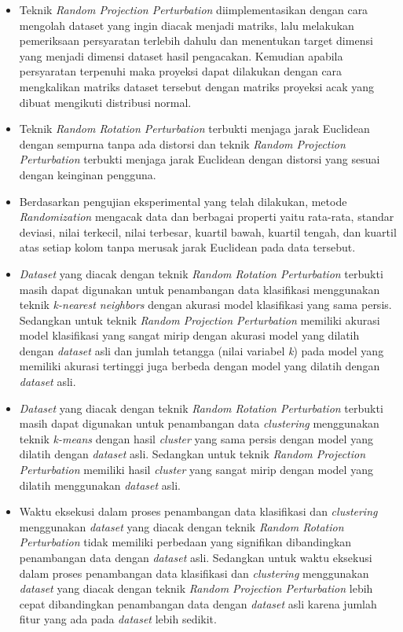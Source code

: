 \begin{itemize}
    \item Teknik \textit{Random Projection Perturbation} diimplementasikan dengan cara mengolah dataset yang ingin diacak menjadi matriks, lalu melakukan pemeriksaan persyaratan terlebih dahulu dan menentukan target dimensi yang menjadi dimensi dataset hasil pengacakan. Kemudian apabila persyaratan terpenuhi maka proyeksi dapat dilakukan dengan cara mengkalikan matriks dataset tersebut dengan matriks proyeksi acak yang dibuat mengikuti distribusi normal.
    \item Teknik \textit{Random Rotation Perturbation} terbukti menjaga jarak Euclidean dengan sempurna tanpa ada distorsi dan teknik \textit{Random Projection Perturbation} terbukti menjaga jarak Euclidean dengan distorsi yang sesuai dengan keinginan pengguna.
    \item Berdasarkan pengujian eksperimental yang telah dilakukan, metode \textit{Randomization} mengacak data dan berbagai properti yaitu rata-rata, standar deviasi, nilai terkecil, nilai terbesar, kuartil bawah, kuartil tengah, dan kuartil atas setiap kolom tanpa merusak jarak Euclidean pada data tersebut.
    \item \textit{Dataset} yang diacak dengan teknik \textit{Random Rotation Perturbation} terbukti masih dapat digunakan untuk penambangan data klasifikasi menggunakan teknik \textit{k-nearest neighbors} dengan akurasi model klasifikasi yang sama persis. Sedangkan untuk teknik \textit{Random Projection Perturbation} memiliki akurasi model klasifikasi yang sangat mirip dengan akurasi model yang dilatih dengan \textit{dataset} asli dan jumlah tetangga (nilai variabel \textit{k}) pada model yang memiliki akurasi tertinggi juga berbeda dengan model yang dilatih dengan \textit{dataset} asli.
    \item \textit{Dataset} yang diacak dengan teknik \textit{Random Rotation Perturbation} terbukti masih dapat digunakan untuk penambangan data \textit{clustering} menggunakan teknik \textit{k-means} dengan hasil \textit{cluster} yang sama persis dengan model yang dilatih dengan \textit{dataset} asli. Sedangkan untuk teknik \textit{Random Projection Perturbation} memiliki hasil \textit{cluster} yang sangat mirip dengan model yang dilatih menggunakan \textit{dataset} asli.
    \item Waktu eksekusi dalam proses penambangan data klasifikasi dan \textit{clustering} menggunakan \textit{dataset} yang diacak dengan teknik \textit{Random Rotation Perturbation} tidak memiliki perbedaan yang signifikan dibandingkan penambangan data dengan \textit{dataset} asli. Sedangkan untuk waktu eksekusi dalam proses penambangan data klasifikasi dan \textit{clustering} menggunakan \textit{dataset} yang diacak dengan teknik \textit{Random Projection Perturbation} lebih cepat dibandingkan penambangan data dengan \textit{dataset} asli karena jumlah fitur yang ada pada \textit{dataset} lebih sedikit.
\end{itemize}

